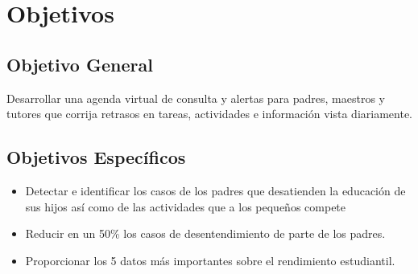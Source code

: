 \section{Objetivos}
	\subsection{Objetivo General}
	Desarrollar una agenda virtual de consulta y alertas para padres, maestros y tutores que corrija retrasos en tareas, actividades e información vista diariamente.
	\subsection{Objetivos Específicos}
	\begin{itemize}
		\item Detectar e identificar los casos de los padres que desatienden la educación de sus hijos así como de las actividades que a los pequeños compete
		\item Reducir en un 50\% los casos de desentendimiento de parte de los padres.
		\item Proporcionar los 5 datos más importantes sobre el rendimiento estudiantil.	
	\end{itemize}
	